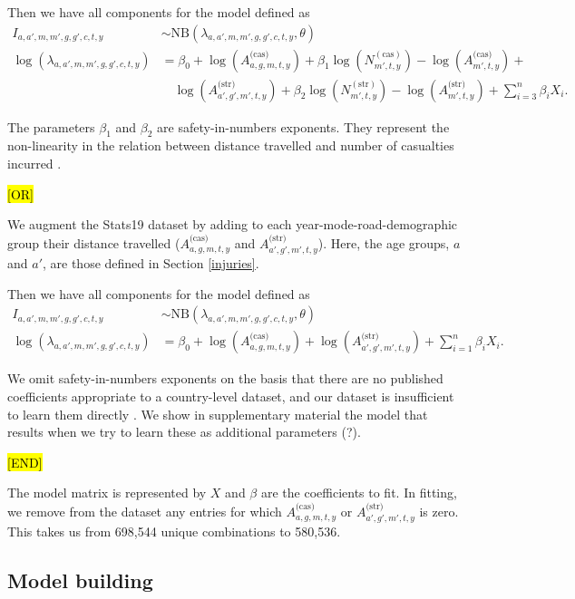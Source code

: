 \documentclass{article}
\begin{document}
Then we have all components for the model defined as
\begin{align}
I_{a,a',m,m',g,g',c,t,y}&\sim \text{NB}(\lambda_{a,a',m,m',g,g',c,t,y},\theta) \\
\log\left(\lambda_{a,a',m,m',g,g',c,t,y}\right) &= {\beta_0} +\log(A_{a,g,m,t,y}^{\text{(cas)}})+{\beta_1}\log\left(N_{m',t,y}^{(\text{cas})}\right)-\log(A_{m',t,y}^{\text{(cas)}})+\nonumber\\
&\quad\log(A_{a',g',m',t,y}^{\text{(str)}})+{\beta_2}\log\left(N_{m',t,y}^{(\text{str})}\right)-\log(A_{m',t,y}^{\text{(str)}})+\sum_{i=3}^n\beta_iX_i.
\end{align}

The parameters $\beta_1$ and $\beta_2$ are safety-in-numbers exponents. They represent the non-linearity in the relation between distance travelled and number of casualties incurred \citep{Aldred2017,Elvik2017}. 

\hl{[OR]}

We augment the Stats19 dataset by adding to each year-mode-road-demographic group their distance travelled ($A_{a,g,m,t,y}^{\text{(cas)}}$ and $A_{a',g',m',t,y}^{\text{(str)}}$). Here, the age groups, $a$ and $a'$, are those defined in Section \ref{injuries}.

Then we have all components for the model defined as
\begin{align}
I_{a,a',m,m',g,g',c,t,y}&\sim \text{NB}(\lambda_{a,a',m,m',g,g',c,t,y},\theta) \\
\log\left(\lambda_{a,a',m,m',g,g',c,t,y}\right) &= {\beta_0} +\log(A_{a,g,m,t,y}^{\text{(cas)}})+\log(A_{a',g',m',t,y}^{\text{(str)}})+\sum_{i=1}^n\beta_iX_i.
\end{align}

We omit safety-in-numbers exponents on the basis that there are no published coefficients appropriate to a country-level dataset, and our dataset is insufficient to learn them directly \citep{Aldred2017,Elvik2017}. We show in supplementary material the model that results when we try to learn these as additional parameters (?).



\hl{[END]}

The model matrix is represented by $X$ and $\beta$ are the coefficients to fit. In fitting, we remove from the dataset any entries for which $A_{a,g,m,t,y}^{\text{(cas)}}$ or $A_{a',g',m',t,y}^{\text{(str)}}$ is zero. This takes us from 698,544 unique combinations to 580,536. 


\subsection{Model building}
\end{document}
